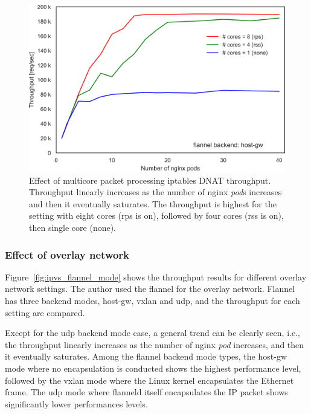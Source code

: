\begin{figure}[h]
  \centering
  \includegraphics[width=0.75\columnwidth]{Figs/iptables_mcore_proccessing}
  \par\bigskip
  \centering
  \begin{minipage}{0.9\columnwidth}
    \caption[Effect of multicore packet processing on iptables DNAT throughput]{
Effect of multicore packet processing iptables DNAT throughput.
Throughput linearly increases as the number of nginx {\em pod}s increases and then it eventually saturates.
The throughput is highest for the setting with eight cores (rps is on), followed by four cores (rss is on), then single core (none).
    }
    \label{fig:iptables_mcore_proccessing}
  \end{minipage}
\end{figure}


\FloatBarrier

\subsubsection{Effect of overlay network}

Figure~\ref{fig:ipvs_flannel_mode} shows the  throughput results for different overlay network settings.
The author used the flannel for the overlay network.
Flannel has three backend modes, host-gw, vxlan and udp, and the throughput for each setting are compared.

Except for the udp backend mode case, a general trend can be clearly seen, i.e., the throughput linearly increases as the number of nginx {\em pod} increases, and then it eventually saturates.
Among the flannel backend mode types, the host-gw mode where no encapsulation is conducted shows the highest performance level,
followed by the vxlan mode where the Linux kernel encapsulates the Ethernet frame.
The udp mode where flanneld itself encapsulates the IP packet shows significantly lower performances levels.


